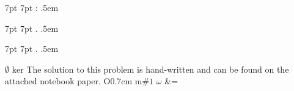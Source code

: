 \usepackage{amsmath}
\usepackage{amssymb}
\usepackage{amsthm}
\usepackage{bm}
\usepackage{enumitem}
\usepackage{graphicx}
\usepackage{mathrsfs}  %
\usepackage{mathtools}
\usepackage{parskip}
\usepackage{xparse}


\newtheorem{theorem}{Theorem}[section]
\newtheorem{corollary}{Corollary}[theorem]
\newtheorem{lemma}{Lemma}

%
   {7pt}%
   {7pt}%
   {}%
   {}%
   {\bfseries}%
   {:}%
   {.5em}%
   {}

%
   {7pt}%
   {7pt}%
   {}%
   {}%
   {\bfseries}%
   {.}%
   {.5em}%
   {}

%
   {7pt}%
   {7pt}%
   {}%
   {}%
   {\itshape}%
   {.}%
   {.5em}%
   {}

\theoremstyle{case}
\newtheorem{case}{Case}

\theoremstyle{claim}
\newtheorem*{claim}{Claim}

\theoremstyle{remark}
\newtheorem*{remark}{Remark}

\makeatletter
\newcommand*{\declarecommand}{%
    \@star@or@long\declare@command
}
\newcommand*{\declare@command}[1]{%
    \provide@command{#1}{}%
    \RenewDocumentCommand{#1}%
}
\makeatother

\renewcommand{\a}{\alpha}
\newcommand{\Bythrm}[1]{By Theorem #1 of the text}
\renewcommand{\b}{\beta}
\newcommand{\bythrm}[1]{by Theorem #1 of the text}
\newcommand{\C}{\mathbb{C}}
\newcommand{\cC}{\mathcal{C}}
\newcommand{\cN}{\mathcal{N}}
\newcommand{\cR}{\mathcal{R}}
\newcommand{\cQ}{\mathcal{Q}}
\newcommand{\cZ}{\mathcal{Z}}
\renewcommand{\cal}[1]{\mathcal{#1}}
\newcommand{\com}[1]{\text{\scriptsize(#1)}}
\renewcommand{\d}{\delta}
\newcommand{\e}{\epsilon}
\declarecommand{\es}{}{\ensuremath{\emptyset}}
\newcommand{\h}[1]{\ensuremath{\hat{#1}}}
\renewcommand{\l}{\ell}
\declarecommand{\ker}{}{\ensuremath{\text{ker}}}
\newcommand{\la}{\leftarrow}
\newcommand{\N}{\mathbb{N}}
\declarecommand{\nb}{}{The solution to this problem is hand-written and can be found on the attached notebook paper.}
\declarecommand{\novs}{O{0.7cm}}{\vspace{-#1}}
\newcommand\numberthis{\addtocounter{equation}{1}\tag{\theequation}}
\newcommand{\R}{\mathbb{R}}
\newcommand{\ra}{\rightarrow}
\newcommand{\s}[1]{\ensuremath{\{#1\}}}
\newcommand{\set}[1]{\ensuremath{\{#1\}}}
\newcommand{\seq}[1]{\left\{#1\right\}_{n=1}^{\infty}}
\newcommand{\struct}[1]{\langle #1 \rangle}
\newcommand{\st}[1]{\ensuremath{\langle #1 \rangle}}
\newcommand{\sub}{\ensuremath{\subset}}
\newcommand{\sube}{\ensuremath{\subseteq}}
\renewcommand{\t}{\theta}
\declarecommand{\tx}{m}{\ensuremath{\text{#1}}}
\newcommand{\vphi}{\varphi}
\declarecommand{\w}{}{\ensuremath{\omega}}
\newcommand{\Q}{\mathbb{Q}}
\newcommand{\Z}{\mathbb{Z}}
\declarecommand{\=}{}{&=}
